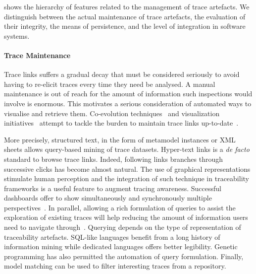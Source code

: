  shows the hierarchy of features related to the management of trace artefacts. We distinguish between the actual maintenance of trace artefacts, the evaluation of their integrity, the means of persistence, and the level of integration in software systems.

\paragraph{Trace Maintenance} 
Trace links suffers a gradual decay that must be considered seriously to avoid having to re-elicit traces every time they need be analysed. A manual maintenance is out of reach for the amount of information such inspections would involve is enormous. This motivates a serious consideration of automated ways to visualise and retrieve them. 
Co-evolution techniques~\cite{mader2008-rule-based-maintenance-post-requirements-traceability,drivalos2010-state-based-traceability} and visualization initiatives~\cite{fittkau2013-explorviz-Trace-Visualization} attempt to tackle the burden to maintain trace links up-to-date~\cite{seibel2010-dynamic-hierarchical-models-comprehensive-traceability,Bunder_2017_query-for-quality}. 

More precisely, structured text, in the form of metamodel instances or XML sheets allows query-based mining of trace datasets. Hyper-text links is a \textit{de facto} standard to browse trace links. Indeed, following links branches through successive clicks has become almost natural. The use of graphical representations stimulate human perception and the integration of such technique in traceability frameworks is a useful feature to augment tracing awareness. Successful dashboards offer to show simultaneously and synchronously multiple perspectives~\cite{ruiz18-traceME-conceptual-model-evolution,santiago2013traceability-in-MDE,heisig2019-generic-traceability-metamodel-end-to-end-capra}.
In parallel, allowing a rich formulation of queries to assist the exploration of existing traces will help reducing the amount of information users need to navigate through~\cite{Bunder_2017_query-for-quality,dietrich2013-learning-efective-query-transformation-for-enhanced-req-trace-retrieval}. Querying depends on the type of representation of traceability artefacts. SQL-like languages benefit from a long history of information mining while dedicated languages offers better legibility. Genetic programming has also permitted the automation of query formulation. Finally, model matching can be used to filter interesting traces from a repository.

